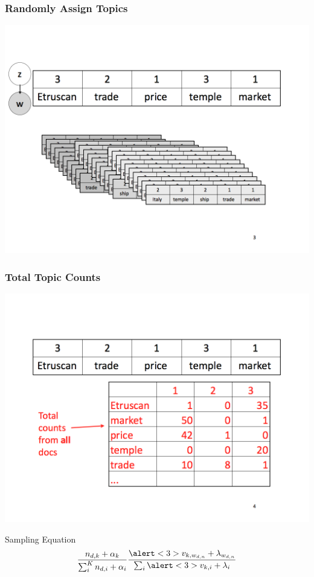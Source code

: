 \begin{frame}
  \frametitle{Randomly Assign Topics}
    \includegraphics[width=\linewidth]{topic_models/mimno_003}
\end{frame}

\begin{frame}
  \frametitle{Total Topic Counts}
    \includegraphics[width=\linewidth]{topic_models/mimno_004}

\pause

\vspace{-4cm}

\begin{block}{Sampling Equation}
	\begin{equation*}
          \frac{n_{d, k} + \alpha_k}{ \sum_{i}^{K} { n_{d,i} + \alpha_i}} \frac{\alert<3>{v_{k, w_{d,n}}} + \lambda_{w_{d,n}}}{ \sum_{i} { \alert<3>{v_{k,i}} + \lambda_{i} }}
	\end{equation*}
\end{block}

\end{frame}


